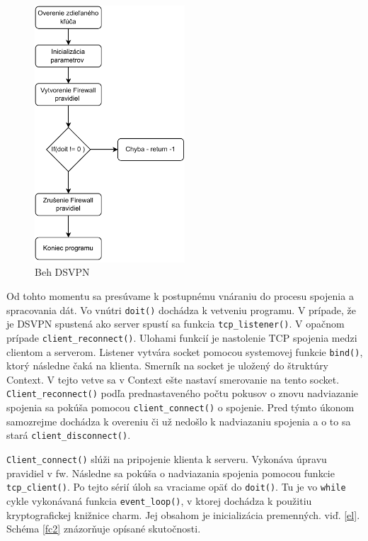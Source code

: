\begin{figure}
	\centering
	\includegraphics[width=0.5\textwidth]{figures/fc1}
	\caption{Beh DSVPN}
	\label{fc1}
\end{figure}

 Od tohto momentu sa presúvame k postupnému vnáraniu do procesu spojenia a spracovania dát. Vo vnútri \lstinline|doit()| dochádza k vetveniu programu. V prípade, že je DSVPN spustená ako server spustí sa funkcia \lstinline|tcp_listener()|. V opačnom prípade \lstinline|client_reconnect()|. Ulohami funkcií je nastolenie TCP spojenia medzi clientom a serverom. Listener vytvára socket pomocou systemovej funkcie \lstinline|bind()|, ktorý následne čaká na klienta. Smerník na socket je uložený do štruktúry Context. V tejto vetve sa v Context ešte nastaví smerovanie na tento socket. \lstinline|Client_reconnect()| podľa prednastaveného počtu pokusov o znovu nadviazanie spojenia sa pokúša pomocou \lstinline|client_connect()| o spojenie. Pred týmto úkonom samozrejme dochádza k overeniu či už nedošlo k nadviazaniu spojenia a o to sa stará \lstinline|client_disconnect()|.


 
  \lstinline|Client_connect()| slúži na pripojenie klienta k serveru. Vykonáva úpravu pravidiel v \acrshort{fw}. Následne sa pokúša o nadviazania spojenia pomocou funkcie  \lstinline|tcp_client()|. Po tejto sérií úloh sa vraciame opäť do \lstinline|doit()|. Tu je vo  \lstinline|while| cykle vykonávaná funkcia \lstinline|event_loop()|, v ktorej dochádza k použitiu kryptografickej knižnice charm. Jej obsahom je inicializácia premenných. viď. \ref{el}. Schéma \ref{fc2} znázorňuje opísané skutočnosti.
  
